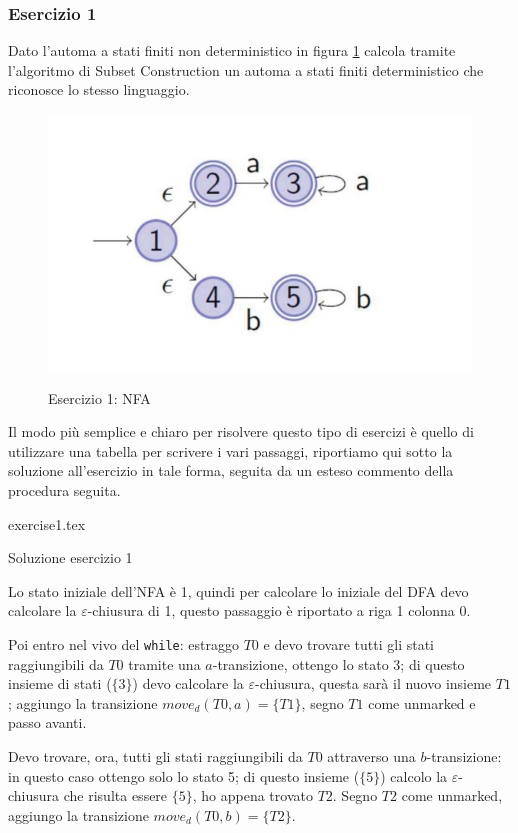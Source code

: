 \documentclass[class=book, crop=false, oneside, 12pt]{standalone}
\begin{document}
\subsubsection*{Esercizio 1}
Dato l'automa a stati finiti non deterministico in figura \ref{es_sc_1} calcola tramite l'algoritmo di Subset Construction un automa a stati finiti deterministico che riconosce lo stesso linguaggio.
\begin{figure}[H]
    \centering
    \includegraphics[width=.7\textwidth,keepaspectratio]{e1_subset_construction.jpg}
    \label{es_sc_1}
    \caption{Esercizio 1: NFA}
\end{figure}
Il modo più semplice e chiaro per risolvere questo tipo di esercizi è quello di utilizzare una tabella per scrivere i vari passaggi, riportiamo qui sotto la soluzione all'esercizio in tale forma, seguita da un esteso commento della procedura seguita.
\begin{table}[H]
	\centering
	{exercise1.tex}
    \caption{Soluzione esercizio 1}
    \label{Esercizio 1}
\end{table} 
Lo stato iniziale dell'NFA è 1, quindi per calcolare lo iniziale del DFA devo calcolare la \(\varepsilon\)-chiusura di 1, questo passaggio è riportato a riga 1 colonna 0.

Poi entro nel vivo del \texttt{while}: estraggo \(T0\) e devo trovare tutti gli stati raggiungibili da \(T0\) tramite una \(a\)-transizione, ottengo lo stato 3; di questo insieme di stati (\(\{3\}\)) devo calcolare la \(\varepsilon\)-chiusura, questa sarà il nuovo insieme \(T1\); aggiungo la transizione \(move_d(T0, a)=\{T1\}\), segno \(T1\) come unmarked e passo avanti.

Devo trovare, ora, tutti gli stati raggiungibili da \(T0\) attraverso una \(b\)-transizione: in questo caso ottengo solo lo stato 5; di questo insieme (\(\{5\}\)) calcolo la \(\varepsilon\)-chiusura che risulta essere \(\{5\}\), ho appena trovato \(T2\). Segno \(T2\) come unmarked, aggiungo la transizione \(move_d(T0, b)=\{T2\}\).
\end{document}
